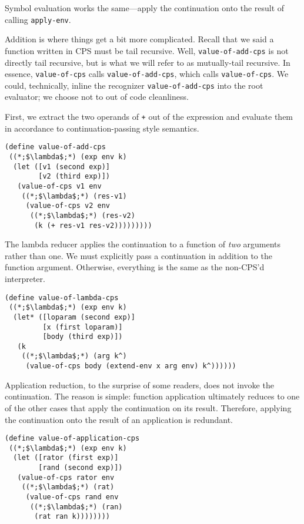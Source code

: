 Symbol evaluation works the same---apply the continuation onto the result of calling \texttt{apply-env}.

Addition is where things get a bit more complicated. Recall that we said a function written in CPS must be tail recursive. Well, \texttt{value-of-add-cps} is not directly tail recursive, but is what we will refer to as mutually-tail recursive. In essence, \texttt{value-of-cps} calls \texttt{value-of-add-cps}, which calls \texttt{value-of-cps}. We could, technically, inline the recognizer \texttt{value-of-add-cps} into the root evaluator; we choose not to out of code cleanliness. 

First, we extract the two operands of \texttt{+} out of the expression and evaluate them in accordance to continuation-passing style semantics.

\begin{cl}[]{}\begin{lstlisting}[language=MyScheme]
(define value-of-add-cps
 ((*;$\lambda$;*) (exp env k)
  (let ([v1 (second exp)]
        [v2 (third exp)])
   (value-of-cps v1 env
    ((*;$\lambda$;*) (res-v1)
     (value-of-cps v2 env
      ((*;$\lambda$;*) (res-v2)
       (k (+ res-v1 res-v2)))))))))
\end{lstlisting}\end{cl}

The lambda reducer applies the continuation to a function of \textit{two} arguments rather than one. We must explicitly pass a continuation in addition to the function argument. Otherwise, everything is the same as the non-CPS'd interpreter.

\begin{cl}[]{}\begin{lstlisting}[language=MyScheme]
(define value-of-lambda-cps
 ((*;$\lambda$;*) (exp env k)
  (let* ([loparam (second exp)]
         [x (first loparam)]
         [body (third exp)])
   (k
    ((*;$\lambda$;*) (arg k^)
     (value-of-cps body (extend-env x arg env) k^))))))
\end{lstlisting}\end{cl}

Application reduction, to the surprise of some readers, does not invoke the continuation. The reason is simple: function application ultimately reduces to one of the other cases that apply the continuation on its result. Therefore, applying the continuation onto the result of an application is redundant.

\begin{cl}[]{}\begin{lstlisting}[language=MyScheme]
(define value-of-application-cps
 ((*;$\lambda$;*) (exp env k)
  (let ([rator (first exp)]
        [rand (second exp)])
   (value-of-cps rator env
    ((*;$\lambda$;*) (rat)
     (value-of-cps rand env
      ((*;$\lambda$;*) (ran)
       (rat ran k))))))))
\end{lstlisting}\end{cl}

